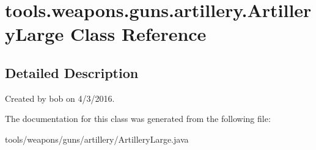 \hypertarget{classtools_1_1weapons_1_1guns_1_1artillery_1_1_artillery_large}{}\section{tools.\+weapons.\+guns.\+artillery.\+Artillery\+Large Class Reference}
\label{classtools_1_1weapons_1_1guns_1_1artillery_1_1_artillery_large}


\subsection{Detailed Description}
Created by bob on 4/3/2016. 

The documentation for this class was generated from the following file\+:\begin{DoxyCompactItemize}
\item 
tools/weapons/guns/artillery/Artillery\+Large.\+java\end{DoxyCompactItemize}
